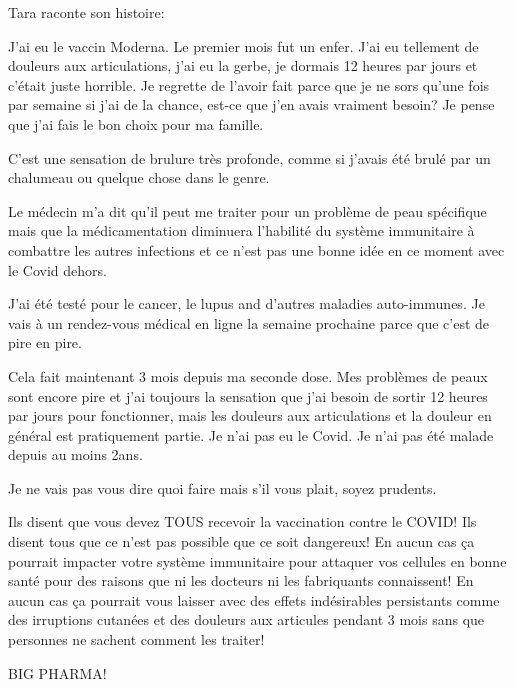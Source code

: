 Tara raconte son histoire:

J'ai eu le vaccin Moderna. Le premier mois fut un enfer. J'ai eu tellement de
douleurs aux articulations, j'ai eu la gerbe, je dormais 12 heures par jours et
c'était juste horrible. Je regrette de l'avoir fait parce que je ne sors qu'une
fois par semaine si j'ai de la chance, est-ce que j'en avais vraiment besoin? Je
pense que j'ai fais le bon choix pour ma famille.

C'est une sensation de brulure très profonde, comme si j'avais été brulé par un
chalumeau ou quelque chose dans le genre.

Le médecin m'a dit qu'il peut me traiter pour un problème de peau spécifique
mais que la médicamentation diminuera l'habilité du système immunitaire à
combattre les autres infections et ce n'est pas une bonne idée en ce moment avec
le Covid dehors.

J'ai été testé pour le cancer, le lupus and d'autres maladies auto-immunes. Je
vais à un rendez-vous médical en ligne la semaine prochaine parce que c'est de
pire en pire.

Cela fait maintenant 3 mois depuis ma seconde dose. Mes problèmes de peaux sont
encore pire et j'ai toujours la sensation que j'ai besoin de sortir 12 heures
par jours pour fonctionner, mais les douleurs aux articulations et la douleur en
général est pratiquement partie. Je n'ai pas eu le Covid. Je n'ai pas été malade
depuis au moins 2ans.

Je ne vais pas vous dire quoi faire mais s'il vous plait, soyez prudents.

Ils disent que vous devez TOUS recevoir la vaccination contre le COVID! Ils
disent tous que ce n'est pas possible que ce soit dangereux! En aucun cas ça
pourrait impacter votre système immunitaire pour attaquer vos cellules en bonne
santé pour des raisons que ni les docteurs ni les fabriquants connaissent! En
aucun cas ça pourrait vous laisser avec des effets indésirables persistants
comme des irruptions cutanées et des douleurs aux articules pendant 3 mois sans
que personnes ne sachent comment les traiter!
  
BIG PHARMA!

